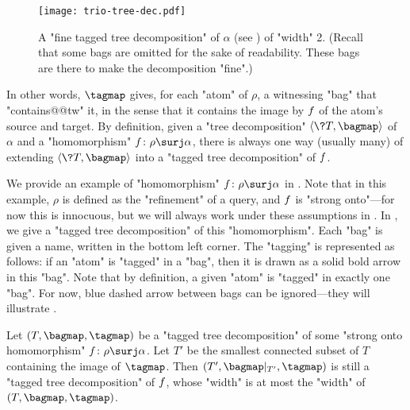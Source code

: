 \begin{figure*}[tbp]
	\centering
	\texttt{[image: trio-tree-dec.pdf]}
	\caption{
		\AP\label{fig:trio-tree-dec}
		A "fine tagged tree decomposition" of $\alpha$ (see ) of "width" 2.
		(Recall that some bags are omitted for the sake of readability. These bags
		are there to make the decomposition "fine".)
	}
\end{figure*}

In other words, $\tagmap$ gives,
for each "atom" of $\rho$, a witnessing "bag" that "contains@@tw" it, in the sense that
it contains the image by $f$ of the atom's source and target.
By definition, given a "tree decomposition" $\tup{\?T, \bagmap}$ of $\alpha$ and a "homomorphism"
$\fun\colon \rho \surj \alpha$, there is always one way (usually many) of extending $\tup{\?T, \bagmap}$
into a "tagged tree decomposition" of $f$.

We provide an example of "homomorphism" $\fun\colon \rho \surj \alpha$ in . Note 
that in this example, $\rho$ is defined as the "refinement" of a query, and $f$ is "strong 
onto"---for now this is innocuous, but we will always work under these
assumptions in . In , we give a "tagged tree 
decomposition" of this "homomorphism". Each "bag" is given a name, written in the bottom left 
corner. The "tagging" is represented as follows: if an "atom" is "tagged" in a "bag", then it
is drawn as a solid bold arrow in this "bag". Note that by definition, a given "atom" is "tagged" in
exactly one "bag". For now, blue dashed arrow between bags can be ignored---they will illustrate .

\begin{fact}
    \AP\label{fact:restriction_tagged_treedec}
    Let $(T, \bagmap, \tagmap)$ be a "tagged tree decomposition" of some "strong onto homomorphism"
    $\fun\colon \rho \surj \alpha$.
    Let $T'$ be the smallest connected subset of $T$ containing the image of $\tagmap$.
    Then $(T', \bagmap\vert_{T'}, \tagmap)$ is still a "tagged tree decomposition" of $f$,
    whose "width" is at most the "width" of $(T, \bagmap, \tagmap)$.
\end{fact}


